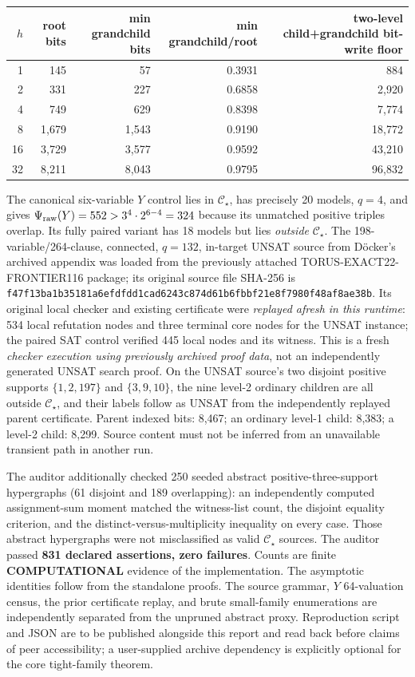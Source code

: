 \documentclass[11pt]{article}
\newcommand{\CS}{\mathcal C_\star}
\begin{document}
\begin{center}\small
\begin{tabular}{rrrrr}
\toprule
\(h\)&root bits&min grandchild bits&min grandchild/root&two-level child+grandchild bit-write floor\\\midrule
1&145&57&0.3931&884\\
2&331&227&0.6858&2,920\\
4&749&629&0.8398&7,774\\
8&1,679&1,543&0.9190&18,772\\
16&3,729&3,577&0.9592&43,210\\
32&8,211&8,043&0.9795&96,832\\
\bottomrule
\end{tabular}
\end{center}

The canonical six-variable \(Y\) control lies in \(\CS\), has precisely 20 models, \(q=4\), and gives \(\Psi_{\rm raw}(Y)=552>3^4\cdot2^{6-4}=324\) because its unmatched positive triples overlap. Its fully paired variant has 18 models but lies \emph{outside} \(\CS\). The 198-variable/264-clause, connected, \(q=132\), in-target UNSAT source from D\"ocker's archived appendix was loaded from the previously attached TORUS-EXACT22-FRONTIER116 package; its original source file SHA-256 is \texttt{f47f13ba1b35181a6efdfdd1cad6243c874d61b6fbbf21e8f7980f48af8ae38b}. Its original local checker and existing certificate were \emph{replayed afresh in this runtime}: 534 local refutation nodes and three terminal core nodes for the UNSAT instance; the paired SAT control verified 445 local nodes and its witness. This is a fresh \emph{checker execution using previously archived proof data}, not an independently generated UNSAT search proof. On the UNSAT source's two disjoint positive supports \(\{1,2,197\}\) and \(\{3,9,10\}\), the nine level-2 ordinary children are all outside \(\CS\), and their labels follow as UNSAT from the independently replayed parent certificate. Parent indexed bits: 8,467; an ordinary level-1 child: 8,383; a level-2 child: 8,299. Source content must not be inferred from an unavailable transient path in another run.

The auditor additionally checked 250 seeded abstract positive-three-support hypergraphs (61 disjoint and 189 overlapping): an independently computed assignment-sum moment matched the witness-list count, the disjoint equality criterion, and the distinct-versus-multiplicity inequality on every case. Those abstract hypergraphs were not misclassified as valid \(\CS\) sources. The auditor passed \textbf{831 declared assertions, zero failures}. Counts are finite \textbf{COMPUTATIONAL} evidence of the implementation. The asymptotic identities follow from the standalone proofs. The source grammar, \(Y\) 64-valuation census, the prior certificate replay, and brute small-family enumerations are independently separated from the unpruned abstract proxy. Reproduction script and JSON are to be published alongside this report and read back before claims of peer accessibility; a user-supplied archive dependency is explicitly optional for the core tight-family theorem.
\end{document}
